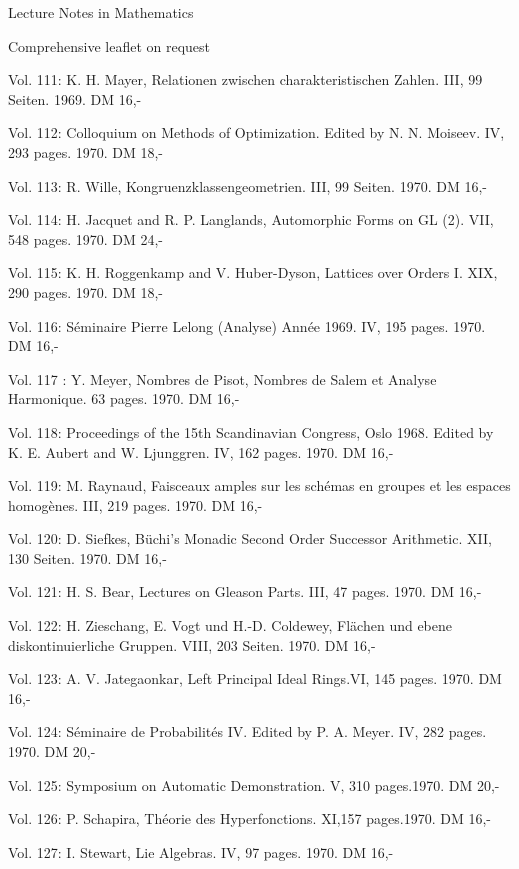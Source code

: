 \clearpage
\begingroup
\small
\sloppy
Lecture Notes in Mathematics


Comprehensive leaflet on request

Vol. 111: K. H. Mayer, Relationen zwischen charakteristischen Zahlen. III, 99 Seiten. 1969. DM 16,-

Vol. 112: Colloquium on Methods of Optimization. Edited by N. N. Moiseev. IV, 293 pages. 1970. DM 18,-

Vol. 113: R. Wille, Kongruenzklassengeometrien. III, 99 Seiten. 1970. DM 16,-

Vol. 114: H. Jacquet and R. P. Langlands, Automorphic Forms on GL (2). VII, 548 pages. 1970. DM 24,-

Vol. 115: K. H. Roggenkamp and V. Huber-Dyson, Lattices over Orders I. XIX, 290 pages. 1970. DM 18,-

Vol. 116: Séminaire Pierre Lelong (Analyse) Année 1969. IV, 195 pages. 1970. DM 16,-

Vol. 117 : Y. Meyer, Nombres de Pisot, Nombres de Salem et Analyse Harmonique. 63 pages. 1970. DM 16,-

Vol. 118: Proceedings of the 15th Scandinavian Congress, Oslo 1968. Edited by K. E. Aubert and W. Ljunggren. IV, 162 pages. 1970. DM 16,-

Vol. 119: M. Raynaud, Faisceaux amples sur les schémas en groupes et les espaces homogènes. III, 219 pages. 1970. DM 16,-

Vol. 120: D. Siefkes, Büchi's Monadic Second Order Successor Arithmetic. XII, 130 Seiten. 1970. DM 16,-

Vol. 121: H. S. Bear, Lectures on Gleason Parts. III, 47 pages. 1970. DM 16,-

Vol. 122: H. Zieschang, E. Vogt und H.-D. Coldewey, Flächen und ebene diskontinuierliche Gruppen. VIII, 203 Seiten. 1970. DM 16,-

Vol. 123: A. V. Jategaonkar, Left Principal Ideal Rings.VI, 145 pages. 1970. DM 16,-

Vol. 124: Séminaire de Probabilités IV. Edited by P. A. Meyer. IV, 282 pages. 1970. DM 20,-

Vol. 125: Symposium on Automatic Demonstration. V, 310 pages.1970. DM 20,-

Vol. 126: P. Schapira, Théorie des Hyperfonctions. XI,157 pages.1970. DM 16,-

Vol. 127: I. Stewart, Lie Algebras. IV, 97 pages. 1970. DM 16,-

